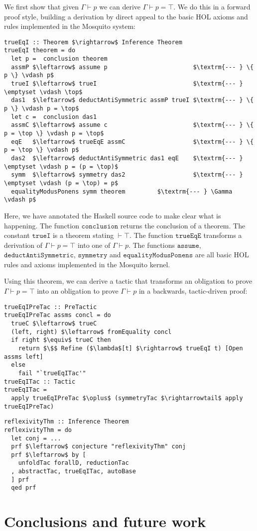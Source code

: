 \documentclass{llncs}
\newcommand{\mosquito}{Mosquito\xspace}
\begin{document}
We first show that given $\Gamma \vdash p$ we can derive $\Gamma \vdash p = \top$.
We do this in a forward proof style, building a derivation by direct appeal to the basic HOL axioms and rules implemented in the \mosquito system:
\begin{lstlisting}
trueEqI :: Theorem $\rightarrow$ Inference Theorem
trueEqI theorem = do
  let p =  conclusion theorem
  assmP $\leftarrow$ assume p                        $\textrm{--- } \{ p \} \vdash p$
  trueI $\leftarrow$ trueI                           $\textrm{--- } \emptyset \vdash \top$
  das1  $\leftarrow$ deductAntiSymmetric assmP trueI $\textrm{--- } \{ p \} \vdash p = \top$
  let c =  conclusion das1
  assmC $\leftarrow$ assume c                        $\textrm{--- } \{ p = \top \} \vdash p = \top$
  eqE   $\leftarrow$ trueEqE assmC                   $\textrm{--- } \{ p = \top \} \vdash p$
  das2  $\leftarrow$ deductAntiSymmetric das1 eqE    $\textrm{--- } \emptyset \vdash p = (p = \top)$
  symm  $\leftarrow$ symmetry das2                   $\textrm{--- } \emptyset \vdash (p = \top) = p$
  equalityModusPonens symm theorem         $\textrm{--- } \Gamma \vdash p$
\end{lstlisting}
Here, we have annotated the Haskell source code to make clear what is happening.
The function $\mathtt{conclusion}$ returns the conclusion of a theorem.
The constant $\mathtt{trueI}$ is a theorem stating $\vdash \top$.
The function $\mathtt{trueEqE}$ transforms a derivation of $\Gamma \vdash p = \top$ into one of $\Gamma \vdash p$.
The functions $\mathtt{assume}$, $\mathtt{deductAntiSymmetric}$, $\mathtt{symmetry}$ and $\mathtt{equalityModusPonens}$ are all basic HOL rules and axioms implemented in the \mosquito kernel.

Using this theorem, we can derive a tactic that transforms an obligation to prove $\Gamma \vdash p = \top$ into an obligation to prove $\Gamma \vdash p$ in a backwards, tactic-driven proof:
\begin{lstlisting}
trueEqIPreTac :: PreTactic
trueEqIPreTac assms concl = do
  trueC $\leftarrow$ trueC
  (left, right) $\leftarrow$ fromEquality concl
  if right $\equiv$ trueC then
    return $\$$ Refine ($\lambda$[t] $\rightarrow$ trueEqI t) [Open assms left]
  else
    fail "`trueEqITac'"
trueEqITac :: Tactic
trueEqITac =
  apply trueEqIPreTac $\oplus$ (symmetryTac $\rightarrowtail$ apply trueEqIPreTac)
\end{lstlisting}

\begin{lstlisting}
reflexivityThm :: Inference Theorem
reflexivityThm = do
  let conj = ...
  prf $\leftarrow$ conjecture "reflexivityThm" conj
  prf $\leftarrow$ by [
    unfoldTac forallD, reductionTac
  , abstractTac, trueEqITac, autoBase
  ] prf
  qed prf
\end{lstlisting}

\section{Conclusions and future work}
\label{sect.conclusions}


\end{document}
